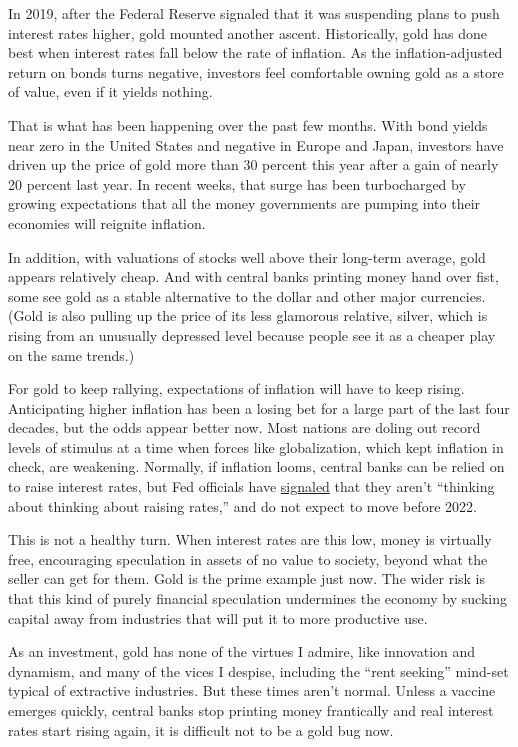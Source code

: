 In 2019, after the Federal Reserve signaled that it was suspending plans
to push interest rates higher, gold mounted another ascent.
Historically, gold has done best when interest rates fall below the rate
of inflation. As the inflation-adjusted return on bonds turns negative,
investors feel comfortable owning gold as a store of value, even if it
yields nothing.

That is what has been happening over the past few months. With bond
yields near zero in the United States and negative in Europe and Japan,
investors have driven up the price of gold more than 30 percent this
year after a gain of nearly 20 percent last year. In recent weeks, that
surge has been turbocharged by growing expectations that all the money
governments are pumping into their economies will reignite inflation.

In addition, with valuations of stocks well above their long-term
average, gold appears relatively cheap. And with central banks printing
money hand over fist, some see gold as a stable alternative to the
dollar and other major currencies. (Gold is also pulling up the price of
its less glamorous relative, silver, which is rising from an unusually
depressed level because people see it as a cheaper play on the same
trends.)

For gold to keep rallying, expectations of inflation will have to keep
rising. Anticipating higher inflation has been a losing bet for a large
part of the last four decades, but the odds appear better now. Most
nations are doling out record levels of stimulus at a time when forces
like globalization, which kept inflation in check, are weakening.
Normally, if inflation looms, central banks can be relied on to raise
interest rates, but Fed officials have
\href{https://www.cnbc.com/2020/06/10/fed-meeting-decision-interest-rates.html}{signaled}
that they aren't ``thinking about thinking about raising rates,'' and do
not expect to move before 2022.

This is not a healthy turn. When interest rates are this low, money is
virtually free, encouraging speculation in assets of no value to
society, beyond what the seller can get for them. Gold is the prime
example just now. The wider risk is that this kind of purely financial
speculation undermines the economy by sucking capital away from
industries that will put it to more productive use.

As an investment, gold has none of the virtues I admire, like innovation
and dynamism, and many of the vices I despise, including the ``rent
seeking'' mind-set typical of extractive industries. But these times
aren't normal. Unless a vaccine emerges quickly, central banks stop
printing money frantically and real interest rates start rising again,
it is difficult not to be a gold bug now.


